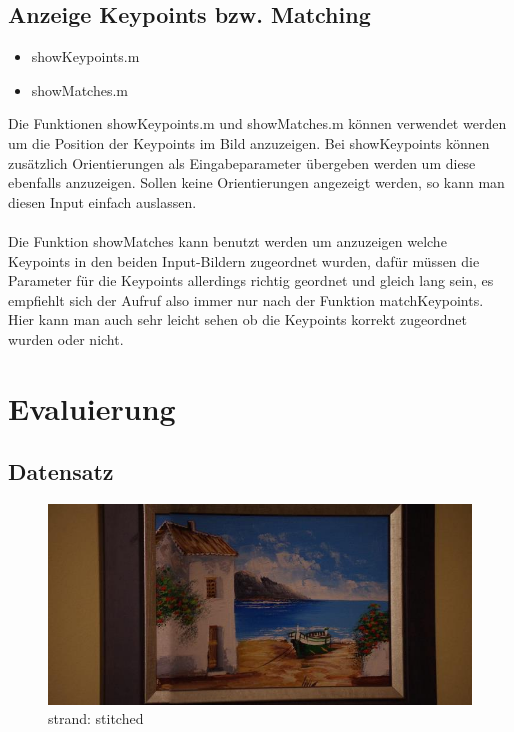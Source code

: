 \documentclass[deutsch]{scrartcl}
\begin{document}
\subsection{Anzeige Keypoints bzw. Matching}
\begin{itemize}
	\item showKeypoints.m
	\item showMatches.m
\end{itemize}
Die Funktionen showKeypoints.m und showMatches.m können verwendet werden um die Position der Keypoints im Bild anzuzeigen. Bei showKeypoints können zusätzlich Orientierungen als Eingabeparameter übergeben werden um diese ebenfalls anzuzeigen. Sollen keine Orientierungen angezeigt werden, so kann man diesen Input einfach auslassen.\\\\
Die Funktion showMatches kann benutzt werden um anzuzeigen welche Keypoints in den beiden Input-Bildern zugeordnet wurden, dafür müssen die Parameter für die Keypoints allerdings richtig geordnet und gleich lang sein, es empfiehlt sich der Aufruf also immer nur nach der Funktion matchKeypoints. Hier kann man auch sehr leicht sehen ob die Keypoints korrekt zugeordnet wurden oder nicht.

\newpage
\section{Evaluierung}

\subsection{Datensatz}



\begin{figure}
\begin{center}
\includegraphics[width=1.0\textwidth]{strandS.png}
\caption{strand: stitched}
\label{fig:strandS}
\end{center}
\end{figure}
\end{document}

